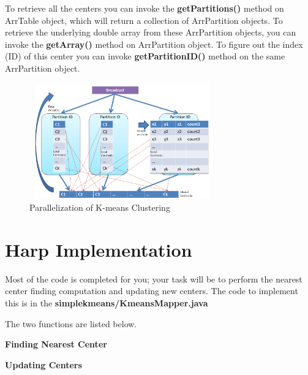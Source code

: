 \documentclass{article}
\begin{document}
To retrieve all the centers you can invoke the \textbf{getPartitions()} method on ArrTable  object, which will return a collection of  ArrPartition objects. To retrieve the underlying double array from these ArrPartition objects, you can invoke the \textbf{getArray()} method on ArrPartition object. To figure out the index (ID) of this center you can invoke \textbf{getPartitionID()} method on the same ArrPartition object.

\begin{figure}[!htbp]
\includegraphics[width=8cm,height=5cm]{p7-3}
\centering
\caption{Parallelization of K-means Clustering}
\end{figure}

\section*{Harp Implementation}
Most of the code is completed for you; your task will be to perform the nearest center finding computation and updating new centers. The code to implement this is in the \textbf{simplekmeans/KmeansMapper.java}

The two functions are listed below.

\textbf{Finding Nearest Center}


\textbf{Updating Centers}

\end{document}
